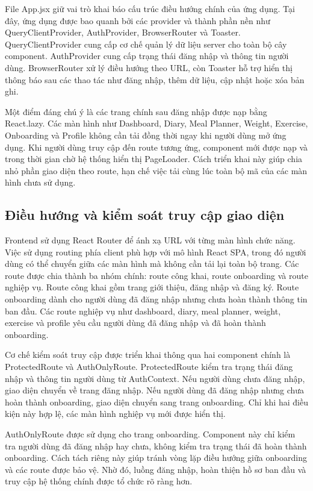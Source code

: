 \documentclass[12pt, a4paper]{report}
\begin{document}
File App.jsx giữ vai trò khai báo cấu trúc điều hướng chính của ứng dụng. Tại đây, ứng dụng được bao quanh bởi các provider và thành phần nền như QueryClientProvider, AuthProvider, BrowserRouter và Toaster. QueryClientProvider cung cấp cơ chế quản lý dữ liệu server cho toàn bộ cây component. AuthProvider cung cấp trạng thái đăng nhập và thông tin người dùng. BrowserRouter xử lý điều hướng theo URL, còn Toaster hỗ trợ hiển thị thông báo sau các thao tác như đăng nhập, thêm dữ liệu, cập nhật hoặc xóa bản ghi.

Một điểm đáng chú ý là các trang chính sau đăng nhập được nạp bằng React.lazy. Các màn hình như Dashboard, Diary, Meal Planner, Weight, Exercise, Onboarding và Profile không cần tải đồng thời ngay khi người dùng mở ứng dụng. Khi người dùng truy cập đến route tương ứng, component mới được nạp và trong thời gian chờ hệ thống hiển thị PageLoader. Cách triển khai này giúp chia nhỏ phần giao diện theo route, hạn chế việc tải cùng lúc toàn bộ mã của các màn hình chưa sử dụng.

\subsection{Điều hướng và kiểm soát truy cập giao diện}Frontend sử dụng React Router để ánh xạ URL với từng màn hình chức năng. Việc sử dụng routing phía client phù hợp với mô hình React SPA, trong đó người dùng có thể chuyển giữa các màn hình mà không cần tải lại toàn bộ trang. Các route được chia thành ba nhóm chính: route công khai, route onboarding và route nghiệp vụ. Route công khai gồm trang giới thiệu, đăng nhập và đăng ký. Route onboarding dành cho người dùng đã đăng nhập nhưng chưa hoàn thành thông tin ban đầu. Các route nghiệp vụ như dashboard, diary, meal planner, weight, exercise và profile yêu cầu người dùng đã đăng nhập và đã hoàn thành onboarding.

Cơ chế kiểm soát truy cập được triển khai thông qua hai component chính là ProtectedRoute và AuthOnlyRoute. ProtectedRoute kiểm tra trạng thái đăng nhập và thông tin người dùng từ AuthContext. Nếu người dùng chưa đăng nhập, giao diện chuyển về trang đăng nhập. Nếu người dùng đã đăng nhập nhưng chưa hoàn thành onboarding, giao diện chuyển sang trang onboarding. Chỉ khi hai điều kiện này hợp lệ, các màn hình nghiệp vụ mới được hiển thị.

AuthOnlyRoute được sử dụng cho trang onboarding. Component này chỉ kiểm tra người dùng đã đăng nhập hay chưa, không kiểm tra trạng thái đã hoàn thành onboarding. Cách tách riêng này giúp tránh vòng lặp điều hướng giữa onboarding và các route được bảo vệ. Nhờ đó, luồng đăng nhập, hoàn thiện hồ sơ ban đầu và truy cập hệ thống chính được tổ chức rõ ràng hơn.
\end{document}
